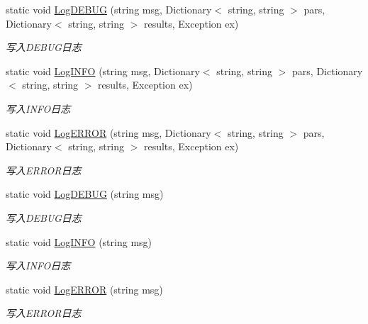 \begin{DoxyCompactItemize}
static void \hyperlink{class_krs_1_1_base_1_1_logs_1_1_log_message_helper_a49ab5d82764bd919a223642892cbc512}{Log\-D\-E\-B\-U\-G} (string msg, Dictionary$<$ string, string $>$ pars, Dictionary$<$ string, string $>$ results, Exception ex)
\begin{DoxyCompactList}\small\item\em 写入\-D\-E\-B\-U\-G日志 \end{DoxyCompactList}\item 
static void \hyperlink{class_krs_1_1_base_1_1_logs_1_1_log_message_helper_af4ec7527336b0786088dfd9f6c9eb10e}{Log\-I\-N\-F\-O} (string msg, Dictionary$<$ string, string $>$ pars, Dictionary$<$ string, string $>$ results, Exception ex)
\begin{DoxyCompactList}\small\item\em 写入\-I\-N\-F\-O日志 \end{DoxyCompactList}\item 
static void \hyperlink{class_krs_1_1_base_1_1_logs_1_1_log_message_helper_abf49053fbeeb35ade54a8f37528d5ecb}{Log\-E\-R\-R\-O\-R} (string msg, Dictionary$<$ string, string $>$ pars, Dictionary$<$ string, string $>$ results, Exception ex)
\begin{DoxyCompactList}\small\item\em 写入\-E\-R\-R\-O\-R日志 \end{DoxyCompactList}\item 
static void \hyperlink{class_krs_1_1_base_1_1_logs_1_1_log_message_helper_a9cd078d57f34d3168acd31f9cdb82787}{Log\-D\-E\-B\-U\-G} (string msg)
\begin{DoxyCompactList}\small\item\em 写入\-D\-E\-B\-U\-G日志 \end{DoxyCompactList}\item 
static void \hyperlink{class_krs_1_1_base_1_1_logs_1_1_log_message_helper_a48887a81a432460cf5a0af40d29bd0ef}{Log\-I\-N\-F\-O} (string msg)
\begin{DoxyCompactList}\small\item\em 写入\-I\-N\-F\-O日志 \end{DoxyCompactList}\item 
static void \hyperlink{class_krs_1_1_base_1_1_logs_1_1_log_message_helper_ac5f47a6b0eff7848ce0317cf6ef36e15}{Log\-E\-R\-R\-O\-R} (string msg)
\begin{DoxyCompactList}\small\item\em 写入\-E\-R\-R\-O\-R日志 \end{DoxyCompactList}\item 

\end{DoxyCompactItemize}
